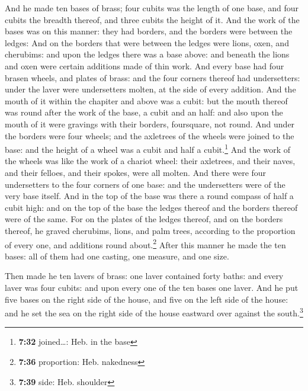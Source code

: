  And he made ten bases of brass; four cubits was the
length of one base, and four cubits the breadth thereof, and three
cubits the height of it.  And the work of the bases was
on this manner: they had borders, and the borders were between the
ledges:  And on the borders that were between the ledges
were lions, oxen, and cherubims: and upon the ledges there was a base
above: and beneath the lions and oxen were certain additions made of
thin work.  And every base had four brasen wheels, and
plates of brass: and the four corners thereof had undersetters: under
the laver were undersetters molten, at the side of every addition.
 And the mouth of it within the chapiter and above was a
cubit: but the mouth thereof was round after the work of the base, a
cubit and an half: and also upon the mouth of it were gravings with
their borders, foursquare, not round.  And under the
borders were four wheels; and the axletrees of the wheels were joined to
the base: and the height of a wheel was a cubit and half a
cubit.\footnote{\textbf{7:32} joined\ldots: Heb. in the base}
 And the work of the wheels was like the work of a
chariot wheel: their axletrees, and their naves, and their felloes, and
their spokes, were all molten.  And there were four
undersetters to the four corners of one base: and the undersetters were
of the very base itself.  And in the top of the base was
there a round compass of half a cubit high: and on the top of the base
the ledges thereof and the borders thereof were of the same.
 For on the plates of the ledges thereof, and on the
borders thereof, he graved cherubims, lions, and palm trees, according
to the proportion of every one, and additions round about.\footnote{\textbf{7:36}
  proportion: Heb. nakedness}  After this manner he made
the ten bases: all of them had one casting, one measure, and one size.

 Then made he ten lavers of brass: one laver contained
forty baths: and every laver was four cubits: and upon every one of the
ten bases one laver.  And he put five bases on the right
side of the house, and five on the left side of the house: and he set
the sea on the right side of the house eastward over against the
south.\footnote{\textbf{7:39} side: Heb. shoulder}


